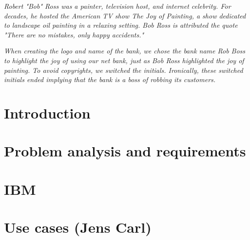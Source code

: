 







\setcounter{tocdepth}{2}
\tableofcontents

\vfill

\textit{Robert "Bob" Ross was a painter, television host, and internet celebrity.
For decades, he hosted the American TV show The Joy of Painting, a show dedicated to landscape oil painting in a relaxing setting. Bob Ross is attributed the quote "There are no mistakes, only happy accidents."}

\textit{When creating the logo and name of the bank, we chose the bank name Rob Boss to highlight the joy of using our net bank, just as Bob Ross highlighted the joy of painting. To avoid copyrights, we switched the initials. Ironically, these switched initials ended implying that the bank is a boss of robbing its customers.}

\newpage

\setcounter{page}{1}

\setcounter{tocdepth}{2}


\section{Introduction}





%


\section{Problem analysis and requirements}\label{sec:problemanalysis_requirements}



\section{IBM}\label{sec:ibm}





%

\section{Use cases (Jens Carl)}
\label{sec:usecases}



